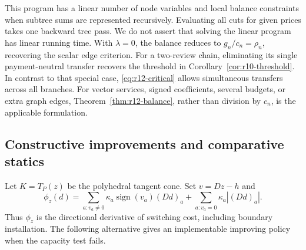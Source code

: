 \documentclass[11pt,letterpaper]{article}
\theoremstyle{definition}
\newcommand{\1}{\mathbf 1}
\begin{document}
This program has a linear number of node variables and local balance constraints when subtree sums are represented recursively. Evaluating all cuts for given prices takes one backward tree pass. We do not assert that solving the linear program has linear running time. With $\lambda=0$, the balance reduces to $g_n/c_n=\rho_n$, recovering the scalar edge criterion. For a two-review chain, eliminating its single payment-neutral transfer recovers the threshold in Corollary~\ref{cor:r10-threshold}. In contrast to that special case, \eqref{eq:r12-critical} allows simultaneous transfers across all branches. For vector services, signed coefficients, several budgets, or extra graph edges, Theorem~\ref{thm:r12-balance}, rather than division by $c_n$, is the applicable formulation.

\subsection{Constructive improvements and comparative statics}
Let $K=T_P(z)$ be the polyhedral tangent cone. Set $v=Dz-h$ and
\[
 \phi_z(d)=\sum_{a:v_a\ne0}\kappa_a\operatorname{sign}(v_a)(Dd)_a
                +\sum_{a:v_a=0}\kappa_a|(Dd)_a|.
\]
Thus $\phi_z$ is the directional derivative of switching cost, including boundary installation. The following alternative gives an implementable improving policy when the capacity test fails.
\end{document}
